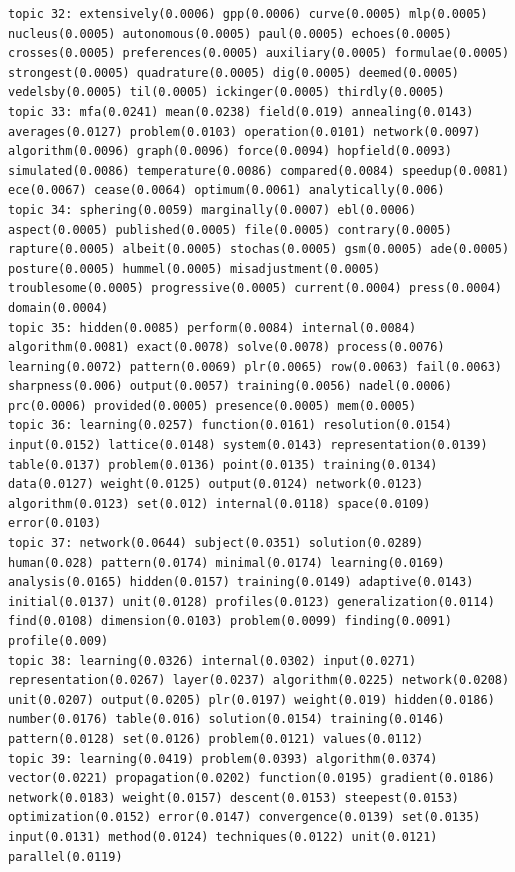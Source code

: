 \documentclass[10pt]{article}
\begin{document}
\begin{verbatim}
topic 32: extensively(0.0006) gpp(0.0006) curve(0.0005) mlp(0.0005) nucleus(0.0005) autonomous(0.0005) paul(0.0005) echoes(0.0005) crosses(0.0005) preferences(0.0005) auxiliary(0.0005) formulae(0.0005) strongest(0.0005) quadrature(0.0005) dig(0.0005) deemed(0.0005) vedelsby(0.0005) til(0.0005) ickinger(0.0005) thirdly(0.0005)
topic 33: mfa(0.0241) mean(0.0238) field(0.019) annealing(0.0143) averages(0.0127) problem(0.0103) operation(0.0101) network(0.0097) algorithm(0.0096) graph(0.0096) force(0.0094) hopfield(0.0093) simulated(0.0086) temperature(0.0086) compared(0.0084) speedup(0.0081) ece(0.0067) cease(0.0064) optimum(0.0061) analytically(0.006)
topic 34: sphering(0.0059) marginally(0.0007) ebl(0.0006) aspect(0.0005) published(0.0005) file(0.0005) contrary(0.0005) rapture(0.0005) albeit(0.0005) stochas(0.0005) gsm(0.0005) ade(0.0005) posture(0.0005) hummel(0.0005) misadjustment(0.0005) troublesome(0.0005) progressive(0.0005) current(0.0004) press(0.0004) domain(0.0004)
topic 35: hidden(0.0085) perform(0.0084) internal(0.0084) algorithm(0.0081) exact(0.0078) solve(0.0078) process(0.0076) learning(0.0072) pattern(0.0069) plr(0.0065) row(0.0063) fail(0.0063) sharpness(0.006) output(0.0057) training(0.0056) nadel(0.0006) prc(0.0006) provided(0.0005) presence(0.0005) mem(0.0005)
topic 36: learning(0.0257) function(0.0161) resolution(0.0154) input(0.0152) lattice(0.0148) system(0.0143) representation(0.0139) table(0.0137) problem(0.0136) point(0.0135) training(0.0134) data(0.0127) weight(0.0125) output(0.0124) network(0.0123) algorithm(0.0123) set(0.012) internal(0.0118) space(0.0109) error(0.0103)
topic 37: network(0.0644) subject(0.0351) solution(0.0289) human(0.028) pattern(0.0174) minimal(0.0174) learning(0.0169) analysis(0.0165) hidden(0.0157) training(0.0149) adaptive(0.0143) initial(0.0137) unit(0.0128) profiles(0.0123) generalization(0.0114) find(0.0108) dimension(0.0103) problem(0.0099) finding(0.0091) profile(0.009)
topic 38: learning(0.0326) internal(0.0302) input(0.0271) representation(0.0267) layer(0.0237) algorithm(0.0225) network(0.0208) unit(0.0207) output(0.0205) plr(0.0197) weight(0.019) hidden(0.0186) number(0.0176) table(0.016) solution(0.0154) training(0.0146) pattern(0.0128) set(0.0126) problem(0.0121) values(0.0112)
topic 39: learning(0.0419) problem(0.0393) algorithm(0.0374) vector(0.0221) propagation(0.0202) function(0.0195) gradient(0.0186) network(0.0183) weight(0.0157) descent(0.0153) steepest(0.0153) optimization(0.0152) error(0.0147) convergence(0.0139) set(0.0135) input(0.0131) method(0.0124) techniques(0.0122) unit(0.0121) parallel(0.0119)

\end{verbatim}
\end{document}
